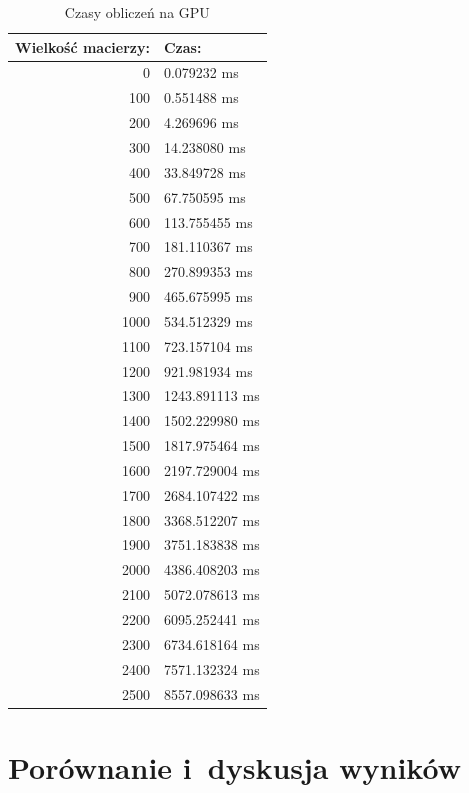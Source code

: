 \documentclass[a4paper,12pt,oneside]{article}
\begin{document}
\begin{table}[H]
\caption{Czasy obliczeń na GPU}
\label{Tabela wyników - GPU}
\begin{center}
\begin{tabular}{|r|l|}
  \hline 
  Wielkość macierzy: & Czas: \\
  \hline 
0 & 0.079232 ms\\
\hline
100 & 0.551488 ms\\
\hline
200 & 4.269696 ms\\
\hline
300 & 14.238080 ms\\
\hline
400 & 33.849728 ms\\
\hline
500 & 67.750595 ms\\
\hline
600 & 113.755455 ms\\
\hline
700 & 181.110367 ms\\
\hline
800 & 270.899353 ms\\
\hline
900 & 465.675995 ms\\
\hline
1000 & 534.512329 ms\\
\hline
1100 & 723.157104 ms\\
\hline
1200 & 921.981934 ms\\
\hline
1300 & 1243.891113 ms\\
\hline
1400 & 1502.229980 ms\\
\hline
1500 & 1817.975464 ms\\
\hline
1600 & 2197.729004 ms\\
\hline
1700 & 2684.107422 ms\\
\hline
1800 & 3368.512207 ms\\
\hline
1900 & 3751.183838 ms\\
\hline
2000 & 4386.408203 ms\\
\hline
2100 & 5072.078613 ms\\
\hline
2200 & 6095.252441 ms\\
\hline
2300 & 6734.618164 ms\\
\hline
2400 & 7571.132324 ms\\
\hline
2500 & 8557.098633 ms\\
\hline
\end{tabular}
\end{center}
\end{table}

\section{Porównanie i~dyskusja wyników}
\end{document}
